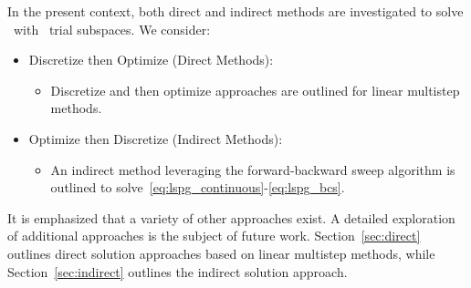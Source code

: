 In the present context, both direct and indirect methods 
are investigated to solve \methodAcronym\ with \spatialAcronym\ trial
subspaces. We consider: 

\begin{itemize} \item Discretize then Optimize (Direct Methods): 
\begin{itemize}
\item Discretize and then optimize approaches are outlined for linear multistep methods. 
\end{itemize} 
\item Optimize then Discretize (Indirect Methods): 
\begin{itemize} 
\item An indirect method leveraging the forward-backward sweep algorithm is outlined 
to solve~\eqref{eq:lspg_continuous}-\eqref{eq:lspg_bcs}. 
 \end{itemize} 
\end{itemize} 
 It
is emphasized that a variety of other approaches exist. A detailed exploration
of additional approaches is the subject of future work.
Section~\ref{sec:direct}  outlines direct solution approaches based on linear
multistep methods, while Section~\ref{sec:indirect} outlines the indirect
solution approach. 





